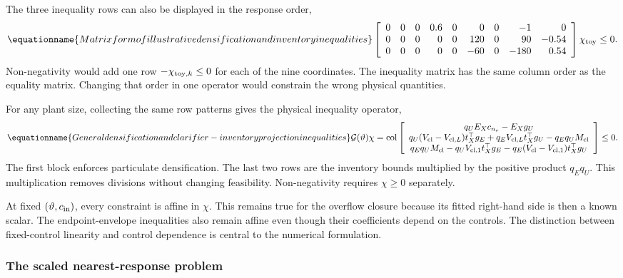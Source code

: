 The three inequality rows can also be displayed in the response order,
\begin{equation}
\equationname{Matrix form of illustrative densification and inventory inequalities}
\left[\begin{array}{rrrrrrrrr}
0&0&0&0.6&0&0&0&-1&0\\
0&0&0&0&0&120&0&90&-0.54\\
0&0&0&0&0&-60&0&-180&0.54
\end{array}\right]\chi_{\rm toy}\le0.
\end{equation}
Non-negativity would add one row $-\chi_{{\rm toy},k}\le0$ for each of the nine coordinates. The inequality matrix has the same column order as the equality matrix. Changing that order in one operator would constrain the wrong physical quantities.

For any plant size, collecting the same row patterns gives the physical inequality operator,
\begin{equation}
\equationname{General densification and clarifier-inventory projection inequalities}
\mathcal G(\vartheta)\chi=
\operatorname{col}\left[
\begin{array}{c}
q_UE_Xc_{n_r}-E_Xg_U\\
q_U(V_{\rm cl}-V_{{\rm cl},L})t_X^\top g_E
+q_EV_{{\rm cl},L}t_X^\top g_U-q_Eq_UM_{\rm cl}\\
q_Eq_UM_{\rm cl}-q_UV_{{\rm cl},1}t_X^\top g_E
-q_E(V_{\rm cl}-V_{{\rm cl},1})t_X^\top g_U
\end{array}\right]\le0.
\label{eq:plant_projection_inequalities}
\end{equation}
The first block enforces particulate densification. The last two rows are the inventory bounds multiplied by the positive product $q_Eq_U$. This multiplication removes divisions without changing feasibility. Non-negativity requires $\chi\ge0$ separately.

At fixed $(\vartheta,c_{\rm in})$, every constraint is affine in $\chi$. This remains true for the overflow closure because its fitted right-hand side is then a known scalar. The endpoint-envelope inequalities also remain affine even though their coefficients depend on the controls. The distinction between fixed-control linearity and control dependence is central to the numerical formulation.

\subsubsection{The scaled nearest-response problem}

